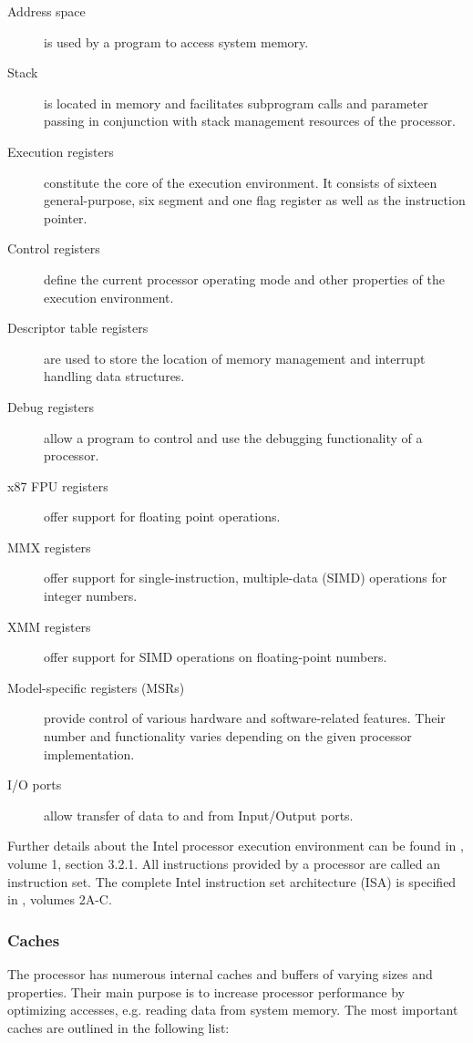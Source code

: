 \begin{description}
	\item[Address space] is used by a program to access system memory.
	\item[Stack] is located in memory and facilitates subprogram calls and
		parameter passing in conjunction with stack management resources of the
		processor.
	\item[Execution registers] constitute the core of the execution environment.
		It consists of sixteen general-purpose, six segment and one flag
		register as well as the instruction pointer.
	\item[Control registers] define the current processor operating mode and
		other properties of the execution environment.
	\item[Descriptor table registers] are used to store the location of memory
		management and interrupt handling data structures.
	\item[Debug registers] allow a program to control and use the debugging
		functionality of a processor.
	\item[x87 FPU registers] offer support for floating point operations.
	\item[MMX registers] offer support for single-instruction, multiple-data
		(SIMD) operations for integer numbers.
	\item[XMM registers] offer support for SIMD operations on floating-point
		numbers.
	\item[Model-specific registers (MSRs)] provide control of various hardware
		and software-related features. Their number and functionality varies
		depending on the given processor implementation.
	\item[I/O ports] allow transfer of data to and from Input/Output ports.
\end{description}

Further details about the Intel processor execution environment can be found in
\cite{IntelSDM}, volume 1, section 3.2.1. All instructions provided by a
processor are called an instruction set. The complete Intel instruction set
architecture (ISA) is specified in \cite{IntelSDM}, volumes 2A-C.

\subsubsection{Caches}
The processor has numerous internal caches and buffers of varying sizes and
properties. Their main purpose is to increase processor performance by
optimizing accesses, e.g. reading data from system memory. The most important
caches are outlined in the following list:

